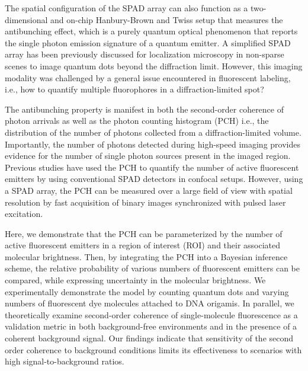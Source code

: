 The spatial configuration of the SPAD array can also function as a two-dimensional and on-chip Hanbury-Brown and Twiss setup that measures the antibunching effect, which is a purely quantum optical phenomenon \parencite{Tenne2019,Treussart2001,Schwartz2012,Ta2010} that reports the single photon emission signature of a quantum emitter. A simplified SPAD array has been previously discussed for localization microscopy in non-sparse scenes \parencite{Israel2017} to image quantum dots beyond the diffraction limit. However, this imaging modality was challenged by a general issue encountered in fluorescent labeling, i.e., how to quantify multiple fluorophores in a diffraction-limited spot? 

The antibunching property is manifest in both the second-order coherence of photon arrivals as well as the photon counting histogram (PCH) \parencite{Chen1999,Huang2004} i.e., the distribution of the number of photons collected from a diffraction-limited volume. Importantly, the number of photons detected during high-speed imaging provides evidence for the number of single photon sources present in the imaged region. Previous studies have used the PCH to quantify the number of active fluorescent emitters by using conventional SPAD detectors in confocal setups. However, using a SPAD array, the PCH can be measured over a large field of view with spatial resolution by fast acquisition of binary images synchronized with pulsed laser excitation. 

Here, we demonstrate that the PCH can be parameterized by the number of active fluorescent emitters in a region of interest (ROI) and their associated molecular brightness. Then, by integrating the PCH into a Bayesian inference scheme, the relative probability of various numbers of fluorescent emitters can be compared, while expressing uncertainty in the molecular brightness. We experimentally demonstrate the model by counting quantum dots and varying numbers of fluorescent dye molecules attached to DNA origamis. In parallel, we theoretically examine second-order coherence of single-molecule fluorescence as a validation metric in both background-free environments and in the presence of a coherent background signal. Our findings indicate that sensitivity of the second order coherence to background conditions limits its effectiveness to scenarios with high signal-to-background ratios.

